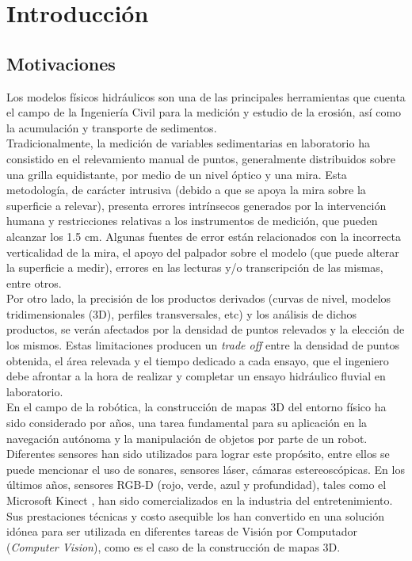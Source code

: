 \chapter{Introducci\'{o}n}

\section{Motivaciones}
\label{sec:motivaciones}

Los modelos físicos hidráulicos son una de las principales herramientas que cuenta el campo de la Ingeniería Civil para la medición y estudio de la erosión, así como la acumulación y transporte de sedimentos. \\
Tradicionalmente, la medición de variables sedimentarias en laboratorio ha consistido en el relevamiento manual de puntos, generalmente distribuidos sobre una grilla equidistante, por medio de un nivel óptico y una mira. Esta metodología, de carácter intrusiva (debido a que se apoya la mira sobre la superficie a relevar), presenta errores intrínsecos generados por la intervención humana y restricciones relativas a los instrumentos de medición, que pueden alcanzar los 1.5 cm. Algunas fuentes de error están relacionados con la incorrecta verticalidad de la mira, el apoyo del palpador sobre el modelo (que puede alterar la superficie a medir), errores en las lecturas y/o transcripción de las mismas, entre otros. \\
Por otro lado, la precisión de los productos derivados (curvas de nivel\cite{wiki-curva-de-nivel}, modelos tridimensionales (3D), perfiles transversales, etc) y los análisis de dichos productos, se verán afectados por la densidad de puntos relevados y la elección de los mismos. Estas limitaciones producen un \textit{trade off} entre la densidad de puntos obtenida, el área relevada y el tiempo dedicado a cada ensayo, que el ingeniero debe afrontar a la hora de realizar y completar un ensayo hidráulico fluvial en laboratorio. \\
En el campo de la robótica, la construcción de mapas 3D del entorno físico ha sido considerado por años, una tarea fundamental para su aplicación en la navegación autónoma y la manipulación de objetos por parte de un robot. Diferentes sensores han sido utilizados para lograr este propósito, entre ellos se puede mencionar el uso de sonares\cite{varveropoulos2005robot}, sensores láser\cite{chou2013robotic}, cámaras estereoscópicas\cite{Konolige08}.
En los últimos años, sensores RGB-D (rojo, verde, azul y profundidad), tales como el Microsoft Kinect \cite{microsoft-kinect}, han sido comercializados en la industria del entretenimiento. Sus prestaciones técnicas y costo asequible los han convertido en una solución idónea para ser utilizada en diferentes tareas de Visión por Computador (\textit{Computer Vision}), como es el caso de la construcción de mapas 3D\cite{henry2010rgb,engelhard2011real}. \\

